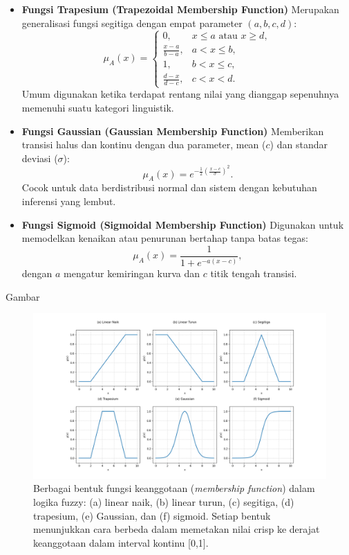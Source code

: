 \documentclass[12pt,a4paper]{article}
\theoremstyle{remark}
\begin{document}
\begin{itemize}
    \item \textbf{Fungsi Trapesium (Trapezoidal Membership Function)}
          Merupakan generalisasi fungsi segitiga dengan empat parameter \((a,b,c,d)\):
          \[
              \mu_A(x) =
              \begin{cases}
                  0,               & x \leq a \text{ atau } x \geq d, \\
                  \frac{x-a}{b-a}, & a < x \leq b,                    \\
                  1,               & b < x \leq c,                    \\
                  \frac{d-x}{d-c}, & c < x < d.
              \end{cases}
          \]
          Umum digunakan ketika terdapat rentang nilai yang dianggap sepenuhnya memenuhi suatu kategori linguistik.

    \item \textbf{Fungsi Gaussian (Gaussian Membership Function)}
          Memberikan transisi halus dan kontinu dengan dua parameter, mean (\(c\)) dan standar deviasi (\(\sigma\)):
          \[
              \mu_A(x) = e^{-\frac{1}{2}\left(\frac{x - c}{\sigma}\right)^2}.
          \]
          Cocok untuk data berdistribusi normal dan sistem dengan kebutuhan inferensi yang lembut.

    \item \textbf{Fungsi Sigmoid (Sigmoidal Membership Function)}
          Digunakan untuk memodelkan kenaikan atau penurunan bertahap tanpa batas tegas:
          \[
              \mu_A(x) = \frac{1}{1 + e^{-a(x-c)}},
          \]
          dengan \(a\) mengatur kemiringan kurva dan \(c\) titik tengah transisi.
\end{itemize}

Gambar
\begin{figure}[H]
    \centering
    \includegraphics[width=1\linewidth]{images/semua_fungsi_keanggotaan.pdf}
    \caption{Berbagai bentuk fungsi keanggotaan (\textit{membership function}) dalam logika fuzzy:
        (a) linear naik,
        (b) linear turun,
        (c) segitiga,
        (d) trapesium,
        (e) Gaussian, dan
        (f) sigmoid.
        Setiap bentuk menunjukkan cara berbeda dalam memetakan nilai crisp ke derajat keanggotaan dalam interval kontinu [0,1].}

    \label{fig:semua_keanggotaan}
\end{figure}
\end{document}
